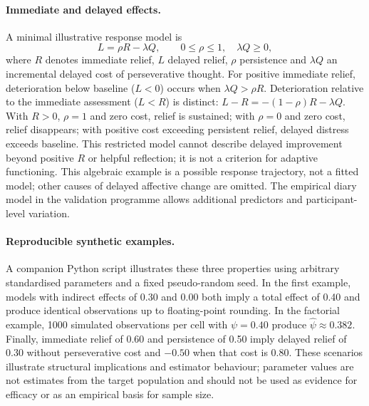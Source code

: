 \paragraph{Immediate and delayed effects.} A minimal illustrative response model is
\[
 L=\rho R-\lambda Q,\qquad 0\leq\rho\leq1,\quad \lambda Q\geq0,
\]
where $R$ denotes immediate relief, $L$ delayed relief, $\rho$ persistence and $\lambda Q$ an incremental delayed cost of perseverative thought. For positive immediate relief, deterioration below baseline ($L<0$) occurs when $\lambda Q>\rho R$. Deterioration relative to the immediate assessment ($L<R$) is distinct: $L-R=-(1-\rho)R-\lambda Q$. With $R>0$, $\rho=1$ and zero cost, relief is sustained; with $\rho=0$ and zero cost, relief disappears; with positive cost exceeding persistent relief, delayed distress exceeds baseline. This restricted model cannot describe delayed improvement beyond positive $R$ or helpful reflection; it is not a criterion for adaptive functioning. This algebraic example is a possible response trajectory, not a fitted model; other causes of delayed affective change are omitted. The empirical diary model in the validation programme allows additional predictors and participant-level variation.

\paragraph{Reproducible synthetic examples.} A companion Python script illustrates these three properties using arbitrary standardised parameters and a fixed pseudo-random seed. In the first example, models with indirect effects of 0.30 and 0.00 both imply a total effect of 0.40 and produce identical observations up to floating-point rounding. In the factorial example, 1000 simulated observations per cell with $\psi=0.40$ produce $\hat\psi\approx0.382$. Finally, immediate relief of 0.60 and persistence of 0.50 imply delayed relief of 0.30 without perseverative cost and $-0.50$ when that cost is 0.80. These scenarios illustrate structural implications and estimator behaviour; parameter values are not estimates from the target population and should not be used as evidence for efficacy or as an empirical basis for sample size.
